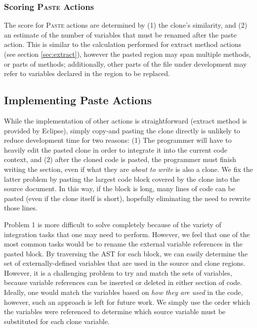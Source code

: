 \documentclass[nocopyrightspace,10pt]{sigplanconf}
\begin{document}
\subsubsection{Scoring \textsc{Paste} Actions}
The score for \textsc{Paste} actions are determined by (1) the clone's
similarity, and (2) an estimate of the number of variables that must
be renamed after the paste action. This is similar to the calculation
performed for extract method actions (see section \ref{sec:extract}),
however the pasted region may span multiple methods, or parts of
methods; additionally, other parts of the file under development may
refer to variables declared in the region to be replaced.

\subsection{Implementing Paste Actions}
 While the implementation of other actions is straightforward 
(extract method is provided by Eclipse), simply 
 copy-and pasting the clone directly is unlikely to reduce development time
 for two reasons: (1) The programmer will have to heavily edit the
 pasted clone in order to integrate it into the current code context, and 
(2) after the cloned code is pasted, the programmer must finish writing 
the section, even if what they are \emph{about to write} is also a clone.
We fix the latter problem by pasting the largest code block covered by the
clone into the source document.  In this way, if the block is long, many lines 
of code can be pasted (even if the clone itself is short), hopefully eliminating the 
need to rewrite those lines. 

 Problem 1 is more difficult to solve completely 
because of the variety of integration tasks that one may need to perform. 
However, we feel that one of the most common tasks would be to rename the 
external variable references in the pasted block.  By traversing the AST for each block,
we can easily determine the set of externally-defined variables that are used in 
the source and clone regions.  However, it is a challenging problem to try and match 
the sets of variables, because variable references can be inserted or deleted in 
either section of code.  Ideally, one would match the variables based on 
\emph{how they are used} in the code, however, such an approach is left for 
future work.  We simply use the order which the variables were referenced to 
determine which source variable must be substituted for each clone variable.

\end{document}
